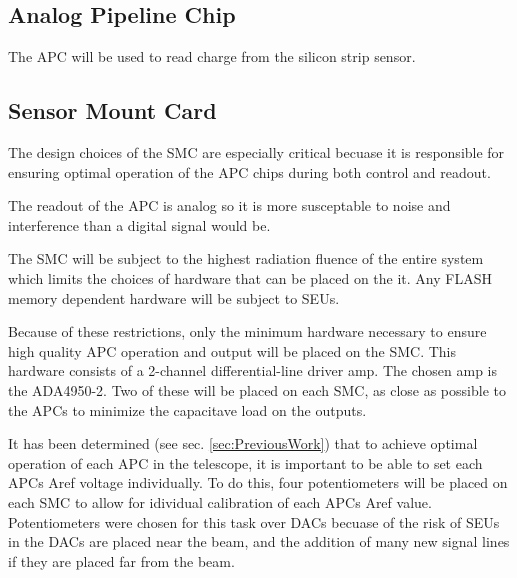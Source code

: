 \documentclass{article}
\begin{document}
\subsection{Analog Pipeline Chip}
The \gls{APC} will be used to read charge from the silicon strip sensor.

\subsection{Sensor Mount Card}
\label{sec:HardProp:SMC}

The design choices of the \gls{SMC} are especially critical becuase it is responsible for ensuring optimal operation of the \gls{APC} chips during both control and readout.

The readout of the \gls{APC} is analog so it is more susceptable to noise and interference than a digital signal would be.

The SMC will be subject to the highest radiation fluence of the entire system which limits the choices of hardware that can be placed on the it. Any FLASH memory dependent hardware will be subject to \gls{SEU}s.

Because of these restrictions, only the minimum hardware necessary to ensure high quality \gls{APC} operation and output will be placed on the SMC. This hardware consists of a 2-channel differential-line driver amp. The chosen amp is the ADA4950-2\cite{ADA4950}. Two of these will be placed on each SMC, as close as possible to the \gls{APC}s to minimize the capacitave load on the outputs.


It has been determined (see sec. \ref{sec:PreviousWork}) that to achieve optimal operation of each \gls{APC} in the telescope, it is important to be able to set each \gls{APC}s Aref voltage individually. To do this, four potentiometers will be placed on each SMC to allow for idividual calibration of each \gls{APC}s Aref value. Potentiometers were chosen for this task over DACs becuase of the risk of \gls{SEU}s in the DACs are placed near the beam, and the addition of many new signal lines if they are placed far from the beam.
\end{document}
